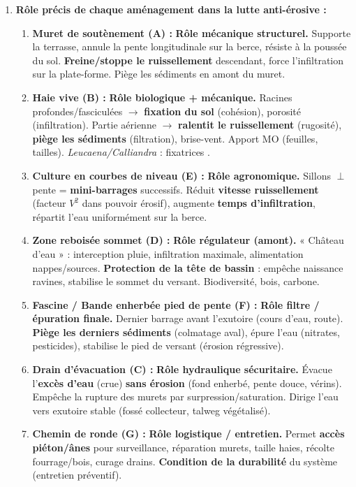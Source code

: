 \documentclass[11pt]{article}
\begin{document}
\begin{corrige}
\begin{enumerate}
    \item \textbf{Rôle précis de chaque aménagement dans la lutte anti-érosive :}
    \begin{enumerate}
        \item \textbf{Muret de soutènement (A) :} \textbf{Rôle mécanique structurel.} Supporte la terrasse, annule la pente longitudinale sur la berce, résiste à la poussée du sol. \textbf{Freine/stoppe le ruissellement} descendant, force l'infiltration sur la plate-forme. Piège les sédiments en amont du muret.
        \item \textbf{Haie vive (B) :} \textbf{Rôle biologique + mécanique.} Racines profondes/fasciculées $\rightarrow$ \textbf{fixation du sol} (cohésion), porosité (infiltration). Partie aérienne $\rightarrow$ \textbf{ralentit le ruissellement} (rugosité), \textbf{piège les sédiments} (filtration), brise-vent. Apport MO (feuilles, tailles). \textit{Leucaena/Calliandra} : fixatrices .
        \item \textbf{Culture en courbes de niveau (E) :} \textbf{Rôle agronomique.} Sillons $\perp$ pente = \textbf{mini-barrages} successifs. Réduit \textbf{vitesse ruissellement} (facteur $V^2$ dans pouvoir érosif), augmente \textbf{temps d'infiltration}, répartit l'eau uniformément sur la berce.
        \item \textbf{Zone reboisée sommet (D) :} \textbf{Rôle régulateur (amont).} « Château d'eau » : interception pluie, infiltration maximale, alimentation nappes/sources. \textbf{Protection de la tête de bassin} : empêche naissance ravines, stabilise le sommet du versant. Biodiversité, bois, carbone.
        \item \textbf{Fascine / Bande enherbée pied de pente (F) :} \textbf{Rôle filtre / épuration finale.} Dernier barrage avant l'exutoire (cours d'eau, route). \textbf{Piège les derniers sédiments} (colmatage aval), épure l'eau (nitrates, pesticides), stabilise le pied de versant (érosion régressive).
        \item \textbf{Drain d'évacuation (C) :} \textbf{Rôle hydraulique sécuritaire.} Évacue l'\textbf{excès d'eau} (crue) \textbf{sans érosion} (fond enherbé, pente douce, vérins). Empêche la rupture des murets par surpression/saturation. Dirige l'eau vers exutoire stable (fossé collecteur, talweg végétalisé).
        \item \textbf{Chemin de ronde (G) :} \textbf{Rôle logistique / entretien.} Permet \textbf{accès piéton/ânes} pour surveillance, réparation murets, taille haies, récolte fourrage/bois, curage drains. \textbf{Condition de la durabilité} du système (entretien préventif).
    \end{enumerate}


\end{enumerate}
\end{corrige}
\end{document}
